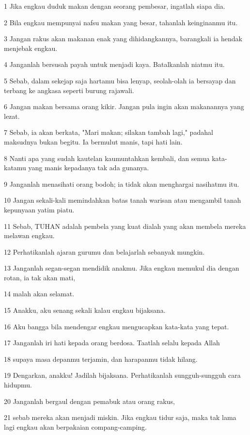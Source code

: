 \par 1 Jika engkau duduk makan dengan seorang pembesar, ingatlah siapa dia.
\par 2 Bila engkau mempunyai nafsu makan yang besar, tahanlah keinginanmu itu.
\par 3 Jangan rakus akan makanan enak yang dihidangkannya, barangkali ia hendak menjebak engkau.
\par 4 Janganlah bersusah payah untuk menjadi kaya. Batalkanlah niatmu itu.
\par 5 Sebab, dalam sekejap saja hartamu bisa lenyap, seolah-olah ia bersayap dan terbang ke angkasa seperti burung rajawali.
\par 6 Jangan makan bersama orang kikir. Jangan pula ingin akan makanannya yang lezat.
\par 7 Sebab, ia akan berkata, "Mari makan; silakan tambah lagi," padahal maksudnya bukan begitu. Ia bermulut manis, tapi hati lain.
\par 8 Nanti apa yang sudah kautelan kaumuntahkan kembali, dan semua kata-katamu yang manis kepadanya tak ada gunanya.
\par 9 Janganlah menasihati orang bodoh; ia tidak akan menghargai nasihatmu itu.
\par 10 Jangan sekali-kali memindahkan batas tanah warisan atau mengambil tanah kepunyaan yatim piatu.
\par 11 Sebab, TUHAN adalah pembela yang kuat dialah yang akan membela mereka melawan engkau.
\par 12 Perhatikanlah ajaran gurumu dan belajarlah sebanyak mungkin.
\par 13 Janganlah segan-segan mendidik anakmu. Jika engkau memukul dia dengan rotan, ia tak akan mati,
\par 14 malah akan selamat.
\par 15 Anakku, aku senang sekali kalau engkau bijaksana.
\par 16 Aku bangga bila mendengar engkau mengucapkan kata-kata yang tepat.
\par 17 Janganlah iri hati kepada orang berdosa. Taatlah selalu kepada Allah
\par 18 supaya masa depanmu terjamin, dan harapanmu tidak hilang.
\par 19 Dengarkan, anakku! Jadilah bijaksana. Perhatikanlah sungguh-sungguh cara hidupmu.
\par 20 Janganlah bergaul dengan pemabuk atau orang rakus,
\par 21 sebab mereka akan menjadi miskin. Jika engkau tidur saja, maka tak lama lagi engkau akan berpakaian compang-camping.
